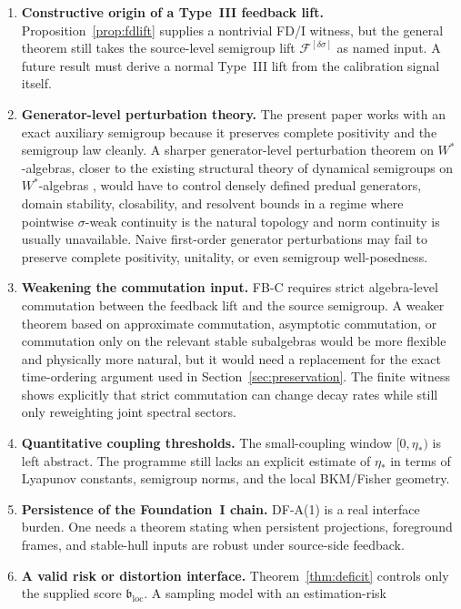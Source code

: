 \documentclass[12pt]{article}
\theoremstyle{definition}
\theoremstyle{remark}
\begin{document}
\begin{enumerate}
\item \textbf{Constructive origin of a Type~III feedback lift.}
  Proposition~\ref{prop:fdlift} supplies a nontrivial FD/I witness, but
  the general theorem still takes the source-level semigroup lift
  \(\mathscr F^{[\delta\sigma]}\) as named input. A future result must
  derive a normal Type~III lift from the calibration signal itself.
\item \textbf{Generator-level perturbation theory.} The present paper
  works with an exact auxiliary semigroup because it preserves complete
  positivity and the semigroup law cleanly. A sharper generator-level
  perturbation theorem on \(W^*\)-algebras, closer to the existing
  structural theory of dynamical semigroups on \(W^*\)-algebras
  \cite{FrigerioVerri1982}, would have to control densely defined
  predual generators, domain stability, closability, and resolvent
  bounds in a regime where pointwise \(\sigma\)-weak continuity is the
  natural topology and norm continuity is usually unavailable. Naive
  first-order generator perturbations may fail to preserve complete
  positivity, unitality, or even semigroup well-posedness.
\item \textbf{Weakening the commutation input.} FB-C requires strict
  algebra-level commutation between the feedback lift and the source
  semigroup. A weaker theorem based on approximate commutation,
  asymptotic commutation, or commutation only on the relevant stable
  subalgebras would be more flexible and physically more natural, but it
  would need a replacement for the exact time-ordering argument used in
  Section~\ref{sec:preservation}. The finite witness shows explicitly
  that strict commutation can change decay rates while still only
  reweighting joint spectral sectors.
\item \textbf{Quantitative coupling thresholds.} The small-coupling
  window \([0,\eta_*)\) is left abstract. The programme still lacks an
  explicit estimate of \(\eta_*\) in terms of Lyapunov constants,
  semigroup norms, and the local BKM/Fisher geometry.
\item \textbf{Persistence of the Foundation~I chain.} DF-A(1) is a real
  interface burden. One needs a theorem stating when persistent
  projections, foreground frames, and stable-hull inputs are robust
  under source-side feedback.
\item \textbf{A valid risk or distortion interface.}
  Theorem~\ref{thm:deficit} controls only the supplied score
  \(\mathfrak b_{\mathrm{loc}}\). A sampling model with an estimation-risk

\end{enumerate}
\end{document}
